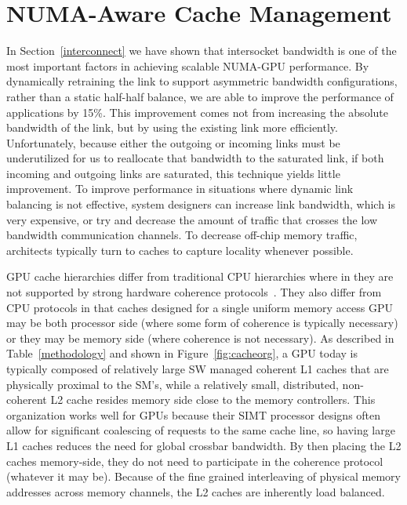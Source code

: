 

\section{NUMA-Aware Cache Management}
\label{caching}
In Section~\ref{interconnect} we have shown that intersocket bandwidth is one
of the most important factors in achieving scalable NUMA-GPU performance. By
dynamically retraining the link to support asymmetric bandwidth configurations,
rather than a static half-half balance, we are able to improve the performance
of applications by 15\%.  This improvement comes not from increasing the
absolute bandwidth of the link, but by using the existing link more efficiently.
Unfortunately, because either the outgoing or incoming links must be underutilized
for us to reallocate that bandwidth to the saturated link, if both incoming and
outgoing links are saturated, this technique yields little improvement.
To improve performance in situations where dynamic link balancing is not effective,
system designers can increase link bandwidth, which is very expensive,
or try and decrease the amount of traffic that crosses the low bandwidth
communication channels.  To decrease off-chip memory traffic, architects typically
turn to caches to capture locality whenever possible.

GPU cache hierarchies differ from traditional CPU hierarchies where in they are
not supported by strong hardware coherence protocols~\cite{XXX}.  They also differ
from CPU protocols in that caches designed for a single uniform memory access GPU
may be both processor side (where some form of coherence is typically necessary)
or they may be memory side (where coherence is not necessary).  As described in
Table~\ref{methodology} and shown in Figure~\ref{fig:cacheorg}, a GPU today is
typically composed of relatively large SW managed coherent L1 caches that are 
physically proximal to the SM's, while a relatively small, distributed, non-coherent 
L2 cache resides memory side close to the memory controllers.  This
organization works well for GPUs because their SIMT processor designs often allow
for significant coalescing of requests to the same cache line, so having large
L1 caches reduces the need for global crossbar bandwidth.  By then placing the L2
caches memory-side, they do not need to participate in the coherence protocol (whatever
it may be).  Because of the fine grained interleaving of physical memory addresses
across memory channels, the L2 caches are inherently load balanced.

